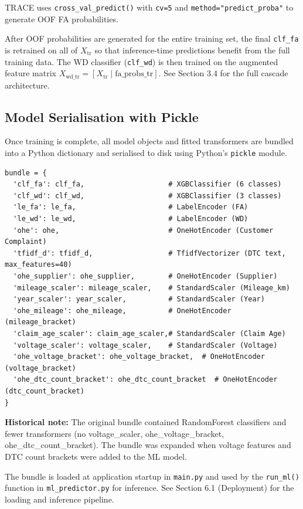 \documentclass[10pt]{article}
\begin{document}
TRACE uses \texttt{cross\_val\_predict()} with \texttt{cv=5} and \texttt{method="predict\_proba"} to generate OOF FA probabilities.

After OOF probabilities are generated for the entire training set, the final \texttt{clf\_fa} is retrained on all of \(X_{\text{tr}}\) so that inference-time predictions benefit from the full training data. The WD classifier (\texttt{clf\_wd}) is then trained on the augmented feature matrix \(X_{\text{wd\_tr}} = [X_{\text{tr}} \mid \text{fa\_probs\_tr}]\). See Section 3.4 for the full cascade architecture.

\subsection{Model Serialisation with Pickle}

Once training is complete, all model objects and fitted transformers are bundled into a Python dictionary and serialised to disk using Python's \texttt{pickle} module.

\begin{verbatim}
bundle = {
  'clf_fa': clf_fa,                    # XGBClassifier (6 classes)
  'clf_wd': clf_wd,                    # XGBClassifier (3 classes)
  'le_fa': le_fa,                      # LabelEncoder (FA)
  'le_wd': le_wd,                      # LabelEncoder (WD)
  'ohe': ohe,                          # OneHotEncoder (Customer Complaint)
  'tfidf_d': tfidf_d,                  # TfidfVectorizer (DTC text, max_features=40)
  'ohe_supplier': ohe_supplier,        # OneHotEncoder (Supplier)
  'mileage_scaler': mileage_scaler,    # StandardScaler (Mileage_km)
  'year_scaler': year_scaler,          # StandardScaler (Year)
  'ohe_mileage': ohe_mileage,          # OneHotEncoder (mileage_bracket)
  'claim_age_scaler': claim_age_scaler,# StandardScaler (Claim Age)
  'voltage_scaler': voltage_scaler,    # StandardScaler (Voltage)
  'ohe_voltage_bracket': ohe_voltage_bracket,  # OneHotEncoder (voltage_bracket)
  'ohe_dtc_count_bracket': ohe_dtc_count_bracket  # OneHotEncoder (dtc_count_bracket)
}
\end{verbatim}

\textbf{Historical note:} The original bundle contained RandomForest classifiers and fewer transformers (no voltage\_scaler, ohe\_voltage\_bracket, ohe\_dtc\_count\_bracket). The bundle was expanded when voltage features and DTC count brackets were added to the ML model.

The bundle is loaded at application startup in \texttt{main.py} and used by the \texttt{run\_ml()} function in \texttt{ml\_predictor.py} for inference. See Section 6.1 (Deployment) for the loading and inference pipeline.
\end{document}
